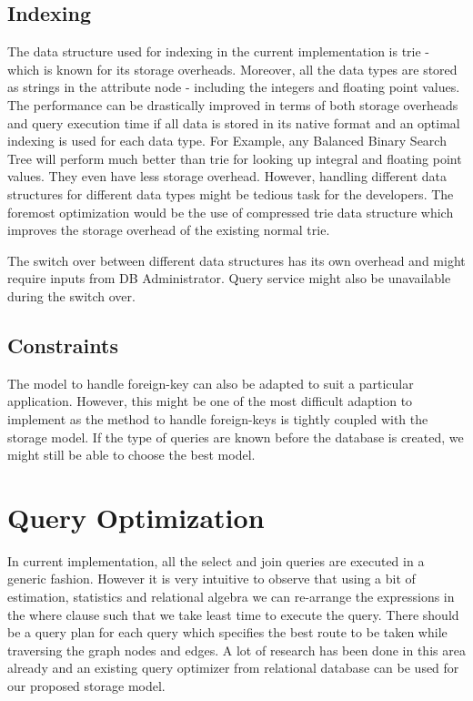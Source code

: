 \documentclass[12pt, oneside]{book}
\begin{document}
\subsection{Indexing}
The data structure used for indexing in the current implementation is trie - which is known for its storage overheads. Moreover, all the data types are stored as strings in the attribute node - including the integers and floating point values. The performance can be drastically improved in terms of both storage overheads and query execution time if all data is stored in its native format and an optimal indexing is used for each data type. For Example, any Balanced Binary Search Tree will perform much better than trie for looking up integral and floating point values. They even have less storage overhead. However, handling different data structures for different data types might be tedious task for the developers. The foremost optimization would be the use of compressed trie data structure which improves the storage overhead of the existing normal trie. \\ \par
The switch over between different data structures has its own overhead and might require inputs from DB Administrator. Query service might also be unavailable during the switch over.
\subsection{Constraints}
The model to handle foreign-key can also be adapted to suit a particular application. However, this might be one of the most difficult adaption to implement as the method to handle foreign-keys is tightly coupled with the storage model. If the type of queries are known before the database is created, we might still be able to choose the best model.
\section{Query Optimization}
In current implementation, all the select and join queries are executed in a generic fashion. However it is very intuitive to observe that using a bit of estimation, statistics and relational algebra we can re-arrange the expressions in the where clause such that we take least time to execute the query. There should be a query plan for each query which specifies the best route to be taken while traversing the graph nodes and edges. A lot of research has been done in this area already and an existing query optimizer from relational database can be used for our proposed storage model.

\pagebreak


%
%
\end{document}

